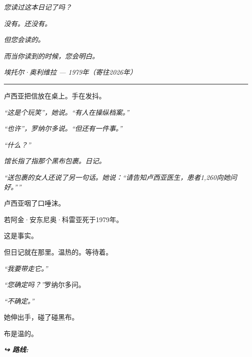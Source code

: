 \noindent \textit{您读过这本日记了吗？}

\noindent \textit{没有。还没有。}

\noindent \textit{但您会读的。}

\noindent \textit{而当你读到的时候，您会明白。}

\noindent \textit{埃托尔·奥利维拉}
\noindent \textit{--- 1979年（寄往2026年）}

\vspace{0.5em}\noindent\rule{\textwidth}{0.5pt}\vspace{0.5em}

\noindent 卢西亚把信放在桌上。手在发抖。

\noindent \textit{\textquotedblleft{}这是个玩笑\textquotedblright{}，她说。\textquotedblleft{}有人在操纵档案。\textquotedblright{}}

\noindent \textit{\textquotedblleft{}也许\textquotedblright{}，罗纳尔多说。\textquotedblleft{}但还有一件事。\textquotedblright{}}

\noindent \textit{\textquotedblleft{}什么？\textquotedblright{}}

\noindent \textit{馆长指了指那个黑布包裹。日记。}

\noindent \textit{\textquotedblleft{}送包裹的女人还说了另一句话。她说：\textquotedblleft{}请告知卢西亚医生，患者1,260向她问好。\textquotedblright{}\textquotedblright{}}

\noindent 卢西亚咽了口唾沫。

\noindent 若阿金·安东尼奥·科雷亚死于1979年。

\noindent 这是事实。

\noindent 但日记就在那里。温热的。等待着。

\noindent \textit{\textquotedblleft{}我要带走它。\textquotedblright{}}

\noindent \textit{\textquotedblleft{}您确定吗？\textquotedblright{}}罗纳尔多问。

\noindent \textit{\textquotedblleft{}不确定。\textquotedblright{}}

\noindent 她伸出手，碰了碰黑布。

\noindent 布是温的。

\vspace{0.5em}
\noindent\textit{\textbf{↪ 路线:}  \rotasep {} \rotasep {}}
